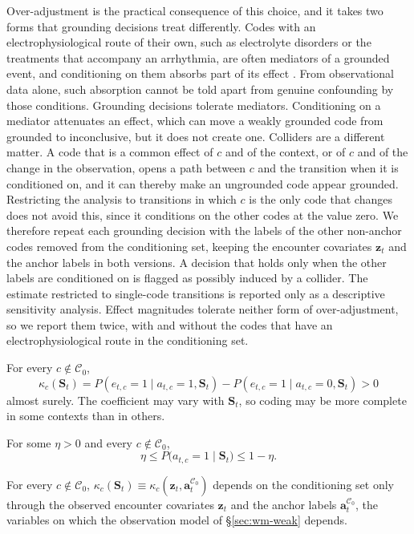 Over-adjustment is the practical consequence of this choice, and it takes two forms that grounding decisions treat differently. Codes with an electrophysiological route of their own, such as electrolyte disorders or the treatments that accompany an arrhythmia, are often mediators of a grounded event, and conditioning on them absorbs part of its effect \citep{schisterman2009overadjustment}. From observational data alone, such absorption cannot be told apart from genuine confounding by those conditions. Grounding decisions tolerate mediators. Conditioning on a mediator attenuates an effect, which can move a weakly grounded code from grounded to inconclusive, but it does not create one. Colliders are a different matter. A code that is a common effect of $c$ and of the context, or of $c$ and of the change in the observation, opens a path between $c$ and the transition when it is conditioned on, and it can thereby make an ungrounded code appear grounded. Restricting the analysis to transitions in which $c$ is the only code that changes does not avoid this, since it conditions on the other codes at the value zero. We therefore repeat each grounding decision with the labels of the other non-anchor codes removed from the conditioning set, keeping the encounter covariates $\mathbf{z}_t$ and the anchor labels in both versions. A decision that holds only when the other labels are conditioned on is flagged as possibly induced by a collider. The estimate restricted to single-code transitions is reported only as a descriptive sensitivity analysis. Effect magnitudes tolerate neither form of over-adjustment, so we report them twice, with and without the codes that have an electrophysiological route in the conditioning set.

\begin{assumption}
\label{ass:wm-labels}
For every $c\notin\mathcal{C}_0$,
\[
\kappa_c(\mathbf{S}_t)=P(e_{t,c}=1\mid a_{t,c}=1,\mathbf{S}_t)-P(e_{t,c}=1\mid a_{t,c}=0,\mathbf{S}_t)>0
\]
almost surely. The coefficient may vary with $\mathbf{S}_t$, so coding may be more complete in some contexts than in others.
\end{assumption}

\begin{assumption}[Overlap]
\label{ass:wm-overlap}
For some $\eta>0$ and every $c\notin\mathcal{C}_0$,
\[
\eta\leq P\big(a_{t,c}=1\mid\mathbf{S}_t\big)\leq1-\eta .
\]
\end{assumption}

\begin{assumption}
\label{ass:wm-recording}
For every $c\notin\mathcal{C}_0$, $\kappa_c(\mathbf{S}_t)\equiv\kappa_c(\mathbf{z}_t,\mathbf{a}^{\mathcal{C}_0}_t)$ depends on the conditioning set only through the observed encounter covariates $\mathbf{z}_t$ and the anchor labels $\mathbf{a}^{\mathcal{C}_0}_t$, the variables on which the observation model of \S\ref{sec:wm-weak} depends.
\end{assumption}

